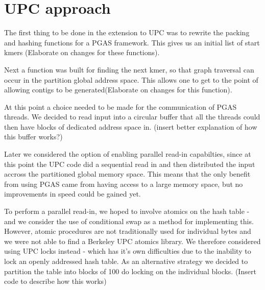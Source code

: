 \documentclass{article}
\newcounter{codecounter}
\newcommand{\mycode}[4]{
  \vspace{1em}
  \begin{mdframed}[backgroundcolor=DarkGray, topline=false,bottomline=false,leftline=false,rightline=false]
  \refstepcounter{codecounter}Algorithm \thecodecounter: #2 \label{#1}
  \end{mdframed}
  \begin{mdframed}[backgroundcolor=LightGray, topline=false, bottomline=false, leftline=false, rightline=false]
    \inputminted
    [
      baselinestretch = 1.2,
      linenos,
      mathescape  = true,
      firstnumber = 1,
      fontsize=\small
    ]{#4}{#3}
  \end{mdframed}
  \begin{mdframed}[backgroundcolor=DarkGray, topline=false,bottomline=false,leftline=false,rightline=false]
  Algorithm \thecodecounter: #2
  \end{mdframed}
  \vspace{1em}
}
\begin{document}






\section{UPC approach}
The first thing to be done in the extension to UPC was to rewrite the packing and hashing functions for a PGAS framework. This gives us an initial list of start kmers ({\color{red}Elaborate on changes for these functions}). 

Next a function was built for finding the next kmer, so that graph traversal can occur in the partition global address space. This allows one to get to the point of allowing contigs to be generated({\color{red}Elaborate on changes for this function}).

At this point a choice needed to be made for the communication of PGAS threads. We decided to read input into a circular buffer that all the threads could then have blocks of dedicated address space in. ({\color{red}insert better explanation of how this buffer works?})

Later we considered the option of enabling parallel read-in capabilties, since at this point the UPC code did a sequential read in and then distributed the input accross the partitioned global memory space. This means that the only benefit from using PGAS came from having access to a large memory space, but no improvements in speed could be gained yet. 

 To perform a parallel read-in, we hoped to involve atomics on the hash table - and we consider the use of conditional swap as a method for implementing this. However, atomic procedures are not traditionally used for individual bytes and we were not able to find a Berkeley UPC atomics library. We therefore considered using UPC locks instead - which has it's own difficulties due to the inability to lock an openly addressed hash table. As an alternative strategy we decided to partition the table into blocks of 100 do locking on the individual blocks. ({\color{red}Insert code to describe how this works}) 
\end{document}
